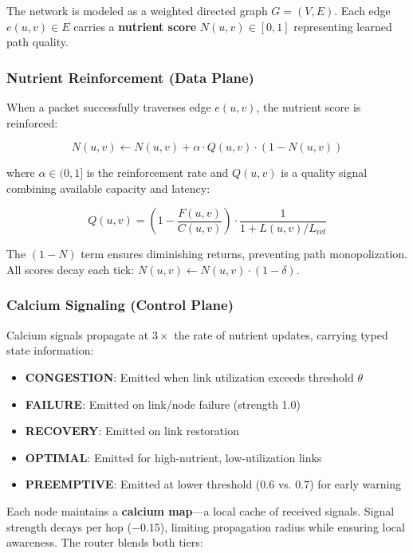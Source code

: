 \documentclass[conference,10pt]{IEEEtran}
\begin{document}
The network is modeled as a weighted directed graph $G = (V, E)$. Each edge $e(u,v) \in E$ carries a \textbf{nutrient score} $N(u,v) \in [0,1]$ representing learned path quality.

\subsubsection{Nutrient Reinforcement (Data Plane)}

When a packet successfully traverses edge $e(u,v)$, the nutrient score is reinforced:

\begin{equation}
    N(u,v) \leftarrow N(u,v) + \alpha \cdot Q(u,v) \cdot (1 - N(u,v))
    \label{eq:reinforce}
\end{equation}

where $\alpha \in (0,1]$ is the reinforcement rate and $Q(u,v)$ is a quality signal combining available capacity and latency:

\begin{equation}
    Q(u,v) = \left(1 - \frac{F(u,v)}{C(u,v)}\right) \cdot \frac{1}{1 + L(u,v)/L_{\text{ref}}}
\end{equation}

The $(1-N)$ term ensures diminishing returns, preventing path monopolization. All scores decay each tick: $N(u,v) \leftarrow N(u,v) \cdot (1 - \delta)$.

\subsubsection{Calcium Signaling (Control Plane)}

Calcium signals propagate at $3\times$ the rate of nutrient updates, carrying typed state information:

\begin{itemize}
    \item \textbf{CONGESTION}: Emitted when link utilization exceeds threshold $\theta$
    \item \textbf{FAILURE}: Emitted on link/node failure (strength 1.0)
    \item \textbf{RECOVERY}: Emitted on link restoration
    \item \textbf{OPTIMAL}: Emitted for high-nutrient, low-utilization links
    \item \textbf{PREEMPTIVE}: Emitted at lower threshold ($0.6$ vs. $0.7$) for early warning
\end{itemize}

Each node maintains a \textbf{calcium map}---a local cache of received signals. Signal strength decays per hop ($-0.15$), limiting propagation radius while ensuring local awareness. The router blends both tiers:
\end{document}
